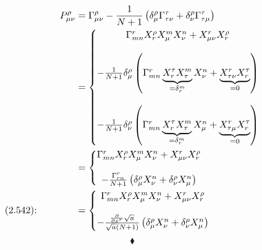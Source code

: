 \begin{align}
P^{\rho}_{\mu\nu} &= \Gamma^{\rho}_{\mu\nu}-\frac{1}{N+1}\left(\delta^{\rho}_{\mu} \Gamma^{\tau}_{\tau \nu}+  \delta^{\rho}_{\nu} \Gamma^{\tau}_{\tau \mu} \right)\\
&= \left\{\begin{matrix}\Gamma^{r}_{mn}X^{\rho}_{r}X^{m}_{\mu}X^{n}_{\nu}+ X^{r}_{\mu\nu}X^{\rho}_{r}\\\\
-\frac{1}{N+1}\delta^{\rho}_{\mu} \left(\Gamma^{r}_{mn}\underbrace{X^{\tau}_{r}X^{m}_{\tau}}_{=\delta^m_r}X^{n}_{\nu}+ \underbrace{X^{r}_{\tau\nu}X^{\tau}_{r}}_{=0}\right)\\\\
-\frac{1}{N+1} \delta^{\rho}_{\nu} \left(\Gamma^{r}_{mn}\underbrace{X^{\tau}_{r}X^{m}_{\tau}}_{=\delta^m_r}X^{n}_{\mu}+\underbrace{ X^{r}_{\tau\mu}X^{\tau}_{r}}_{=0}\right)
\end{matrix}\right.\\
&= \left\{\begin{matrix}\Gamma^{r}_{mn}X^{\rho}_{r}X^{m}_{\mu}X^{n}_{\nu}+ X^{r}_{\mu\nu}X^{\rho}_{r}\\\\
-\frac{\Gamma^{r}_{rn}}{N+1}\left(\delta^{\rho}_{\mu} X^{n}_{\nu}
+\delta^{\rho}_{\nu}X^{n}_{\mu}\right)
\end{matrix}\right.\\
\text{(2.542):}\quad\quad\quad\quad&= \left\{\begin{matrix}\Gamma^{r}_{mn}X^{\rho}_{r}X^{m}_{\mu}X^{n}_{\nu}+ X^{r}_{\mu\nu}X^{\rho}_{r}\\\\
-\frac{\pdv{}{x^r}\sqrt{a}}{\sqrt{a}(N+1)}\left(\delta^{\rho}_{\mu} X^{n}_{\nu}
+\delta^{\rho}_{\nu}X^{n}_{\mu}\right)
\end{matrix}\right.
\end{align}
$$\blacklozenge$$
\newpage



